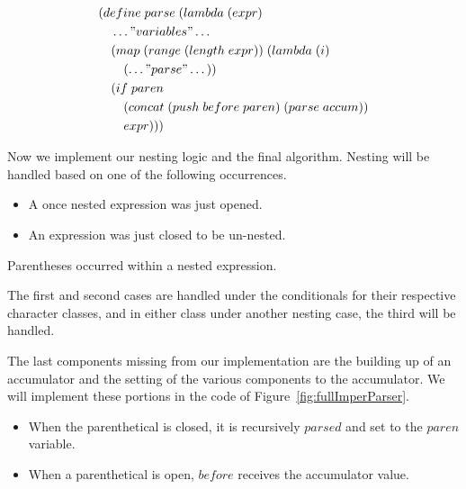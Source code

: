 \begin{figure}[htp]
\footnotesize
\caption{}\label{fig:postscriptReturn}
\begin{align*}
& (define \; parse \; (lambda \; (expr) \; 
\\& \quad \dots"variables"\dots
\\& \quad (map \; (range \; (length \; expr)) \; (lambda \; (i)
\\& \qquad (\dots"parse"\dots))
\\& \quad (if \; paren
\\& \qquad (concat \; (push \; before \; paren) \; (parse \; accum))
\\& \qquad expr)))
\end{align*}
\end{figure}

Now we implement our nesting logic and the final algorithm. Nesting will be handled 
based on one of the following occurrences.

\begin{itemize}
  \item A once nested expression was just opened.
  \item An expression was just closed to be un-nested.
\end{itemize}
 Parentheses occurred within a nested expression.

The first and second cases are handled under the conditionals for their respective 
character classes, and in either class under another nesting case, the third will be 
handled.

The last components missing from our implementation are the building up of an 
accumulator and the setting of the various components to the accumulator. We will 
implement these portions in the code of Figure~\ref{fig:fullImperParser}.

\begin{itemize}
  \item When the parenthetical is closed, it is recursively $parsed$ and set to the $paren$ variable.
  \item When a parenthetical is open, $before$ receives the accumulator value.
\end{itemize}

